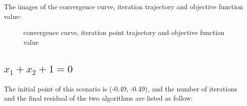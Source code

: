 \documentclass[12pt]{article}
\begin{document}
The images of the convergence curve, iteration trajectory and objective function value:\\
\begin{figure}[ht]
\centering
{}
\caption[]{convergence curve, iteration point trajectory and objective function value}
\label{fig:s1}
\end{figure}
\subsection{$x_1 + x_2 + 1 = 0 $}

The initial point of this scenario is (-0.49, -0.49), and the number of iterations and the final residual of the two algorithms are listed as follow:\\
\begin{table}[h]
    \centering
    \caption{s3}
    \label{tab:s2}
\end{table}
\end{document}
